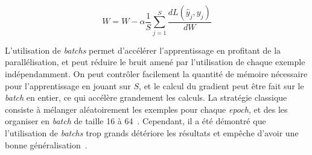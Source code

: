 \begin{equation}
W = W - \alpha \frac{1}{S} \sum_{j=1}^S \frac{dL(\hat{y}_j, y_j)}{dW}
\label{eq:sgdbatch}
\end{equation}

L'utilisation de \textit{batchs} permet d'accélérer l'apprentissage en profitant de la parallélisation, et peut réduire le bruit amené par l'utilisation de chaque exemple indépendamment.
On peut contrôler facilement la quantité de mémoire nécessaire pour l'apprentissage en jouant sur $S$, et le calcul du gradient peut être fait sur le \textit{batch} en entier, ce qui accélère grandement les calculs.
La stratégie classique consiste à mélanger aléatoirement les exemples pour chaque \textit{epoch}, et des les organiser en \textit{batch} de taille 16 à 64~\cite{bengio2012practical}.
Cependant, il a été démontré que l'utilisation de \textit{batchs} trop grands détériore les résultats et empêche d'avoir une bonne généralisation~\cite{masters2018revisiting}.












